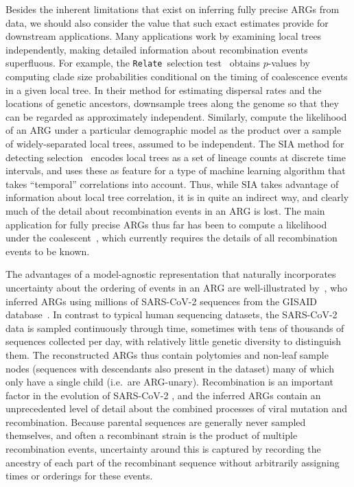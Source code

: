 \documentclass{article}
\newcommand{\relate}[0]{\texttt{Relate}}
\begin{document}
Besides the inherent limitations that exist on inferring fully
precise ARGs from data,
we should also consider the value that such exact estimates provide
for downstream applications.
Many applications work by examining local trees independently,
making detailed information about recombination events superfluous.
For example, the \relate\ selection test~\citep{speidel2019method}
obtains $p$-values by computing clade size probabilities conditional
on the timing of coalescence events in a given local tree.
In their method
for estimating dispersal rates and the locations of genetic
ancestors,
\cite{osmond2021estimating} downsample trees along the genome
so that they can be regarded as approximately independent.
Similarly, \cite{fan2023likelihood} compute the likelihood
of an ARG under a particular demographic model as the product
over a sample of widely-separated local trees, assumed to be independent.
The SIA method for detecting selection~\citep{hejase2022deep}
encodes local trees as a set of lineage counts at discrete
time intervals, and uses these as feature for a
type of machine learning algorithm
that takes ``temporal'' correlations into account.
Thus, while SIA takes advantage of information about local tree correlation,
it is in quite an indirect way, and
clearly much of the detail about recombination events in an ARG is lost.
The main application for fully precise ARGs thus far has been
to compute a likelihood under the
coalescent~\citep[e.g.][]{kuhner2000maximum,mahmoudi2022bayesian,
guo2022recombination},
which currently requires the details of all recombination
events to be known.

The advantages of a model-agnostic representation that naturally
incorporates uncertainty about the ordering of events in an ARG
are well-illustrated by~\cite{zhan2023towards}, who
inferred ARGs using millions of SARS-CoV-2 sequences from the
GISAID database~\citep{shu2017gisaid}.
In contrast to typical human sequencing datasets, the SARS-CoV-2 data is
sampled continuously through time, sometimes with tens of thousands of sequences collected per day, with relatively little genetic diversity to
distinguish them. The reconstructed ARGs thus contain polytomies
and non-leaf sample nodes (sequences with descendants also present
in the dataset) many of which only have a single child (i.e.\ are ARG-unary).
Recombination is an important factor in the evolution of
SARS-CoV-2 \citep{vaninsberghe2021recombinant,jackson2021generation,ignatieva2022ongoing},
and the inferred ARGs contain an unprecedented level of detail about
the combined processes of viral mutation and recombination.
Because parental sequences
are generally never sampled themselves, and often
a recombinant strain is the product of multiple recombination events,
uncertainty around this is captured by recording the ancestry
of each part of the recombinant sequence without arbitrarily assigning
times or orderings for these events.
\end{document}
